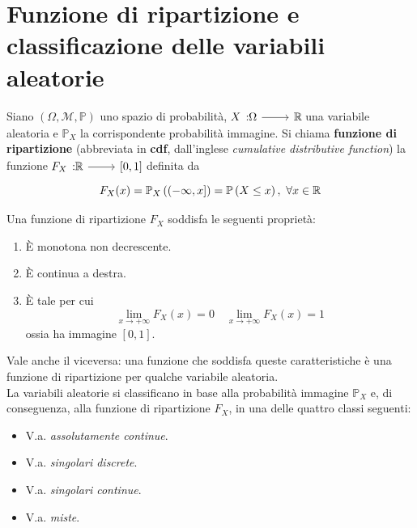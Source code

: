 \section{Funzione di ripartizione e classificazione delle variabili aleatorie}
\begin{define}
	Siano $\left(\Omega,\mathcal{M},\mathbb{P}\right)$ uno spazio di probabilità, $\funz{X}{\Omega}{\realset}$ una variabile aleatoria e $\mathbb{P}_X$ la corrispondente probabilità immagine. Si chiama \textbf{funzione di ripartizione} (abbreviata in \textbf{cdf}, dall'inglese \textit{cumulative distributive function}) la funzione $\funz{F_X}{\realset}{\left[0,1\right]}$ definita da
	\begin{equation}
		F_X(x)=\mathbb{P}_X\left(\left(-\infty,x\right]\right)=\mathbb{P}\left(X\leq x\right),\ \forall x\in\mathbb{R}
	\end{equation}
\end{define}
Una funzione di ripartizione $F_X$ soddisfa le seguenti proprietà:
\begin{enumerate}
	\item È monotona non decrescente.
	\item È continua a destra.
	\item È tale per cui
	\begin{equation}
		\lim_{x\to+\infty}F_X(x)=0\quad\lim_{x\to+\infty}F_X(x)=1
	\end{equation}
	ossia ha immagine $\left[0,1\right]$.
\end{enumerate}
Vale anche il viceversa: una funzione che soddisfa queste caratteristiche è una funzione di ripartizione per qualche variabile aleatoria.\\
La variabili aleatorie si classificano in base alla probabilità immagine $\mathbb{P}_X$ e, di conseguenza, alla funzione di ripartizione $F_X$, in una delle quattro classi seguenti:
\begin{itemize}
	\item V.a. \textit{assolutamente continue}.
	\item V.a. \textit{singolari discrete}.
	\item V.a. \textit{singolari continue}.
	\item V.a. \textit{miste}.
\end{itemize}
